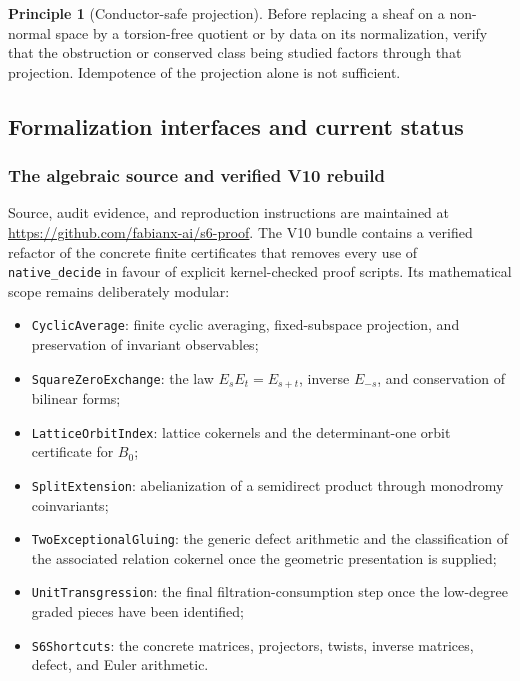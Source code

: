 \documentclass[11pt,reqno]{amsart}
\numberwithin{equation}{section}
\theoremstyle{definition}
\newtheorem{principle}[principle]{Principle}
\begin{document}
\begin{principle}[Conductor-safe projection]\label{pr:conductor-safe}
Before replacing a sheaf on a non-normal space by a torsion-free quotient or by data on its normalization, verify that the obstruction or conserved class being studied factors through that projection. Idempotence of the projection alone is not sufficient.
\end{principle}

\subsection{Formalization interfaces and current status}\label{sec:formalization}

\subsubsection{The algebraic source and verified V10 rebuild}

Source, audit evidence, and reproduction instructions are maintained at \url{https://github.com/fabianx-ai/s6-proof}. The V10 bundle contains a verified refactor of the concrete finite certificates that removes every use of \texttt{native\_decide} in favour of explicit kernel-checked proof scripts. Its mathematical scope remains deliberately modular:
\begin{itemize}
\item \texttt{CyclicAverage}: finite cyclic averaging, fixed-subspace projection, and preservation of invariant observables;
\item \texttt{SquareZeroExchange}: the law $E_sE_t=E_{s+t}$, inverse $E_{-s}$, and conservation of bilinear forms;
\item \texttt{LatticeOrbitIndex}: lattice cokernels and the determinant-one orbit certificate for $B_0$;
\item \texttt{SplitExtension}: abelianization of a semidirect product through monodromy coinvariants;
\item \texttt{TwoExceptionalGluing}: the generic defect arithmetic and the classification of the associated relation cokernel once the geometric presentation is supplied;
\item \texttt{UnitTransgression}: the final filtration-consumption step once the low-degree graded pieces have been identified;
\item \texttt{S6Shortcuts}: the concrete matrices, projectors, twists, inverse matrices, defect, and Euler arithmetic.
\end{itemize}
\end{document}
